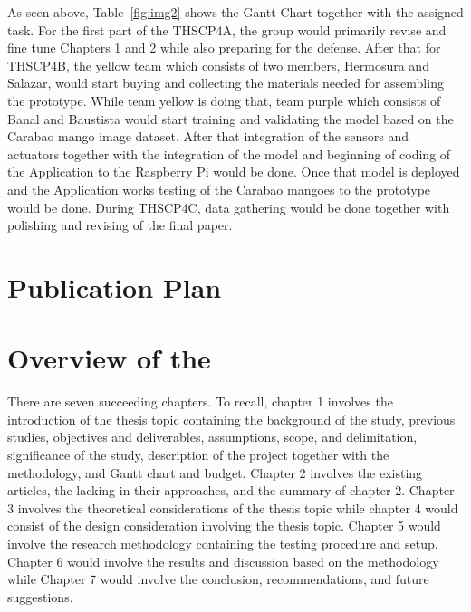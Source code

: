 As seen above, Table~\ref{fig:img2} shows the Gantt Chart together with the assigned task. For the
first part of the THSCP4A, the group would primarily revise and fine tune Chapters 1
and 2 while also preparing for the defense. After that for THSCP4B, the yellow team
which consists of two members, Hermosura and Salazar, would start buying and
collecting the materials needed for assembling the prototype. While team yellow is
doing that, team purple which consists of Banal and Baustista would start training and
validating the  model based on the Carabao mango image dataset. After that
integration of the sensors and actuators together with the integration of the  model
and beginning of coding of the Application to the Raspberry Pi would be done. Once
that  model is deployed and the Application works testing of the Carabao mangoes
to the prototype would be done. During THSCP4C, data gathering would be done
together with polishing and revising of the final paper.

\ifPhD
\section{Publication Plan}
\graytx{\blindtext}
\fi

\fi


\section{Overview of the \documentType}

There are seven succeeding chapters. To recall, chapter 1 involves the introduction of the
thesis topic containing the background of the study, previous studies, objectives and
deliverables, assumptions, scope, and delimitation, significance of the study, description
of the project together with the methodology, and Gantt chart and budget. Chapter 2
involves the existing articles, the lacking in their approaches, and the summary of
chapter 2. Chapter 3 involves the theoretical considerations of the thesis topic while
chapter 4 would consist of the design consideration involving the thesis topic. Chapter 5
would involve the research methodology containing the testing procedure and setup.
Chapter 6 would involve the results and discussion based on the methodology while
Chapter 7 would involve the conclusion, recommendations, and future suggestions.
